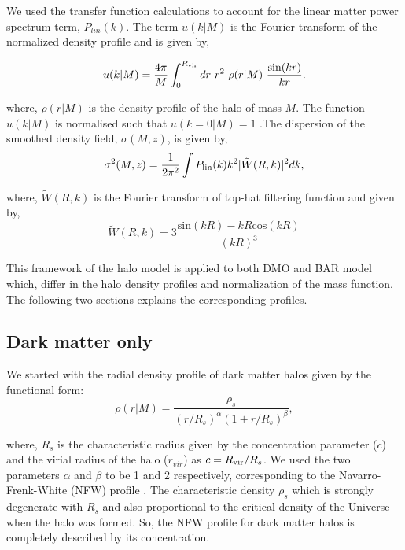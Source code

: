 \documentclass[
  11pt,
  twoside,
  openright,
  titlepage,
  headings=optiontoheadandtoc
]{scrbook}
\begin{document}
We used the \cite{1998ApJ...496..605E, 1999ApJ...511....5E} transfer function calculations to account for the linear matter power spectrum term, $P_{lin}(k)$. The term $u(k|M)$ is the Fourier transform of the normalized density profile and is given by,

\begin{equation}
	u(k|M) = \dfrac{4 \pi}{M} \int_0^{R_{\rm vir}}dr\  r^2\  \rho(r|M)\ \dfrac{\sin(kr)}{kr}.
\end{equation}

where, $\rho(r|M)$ is the density profile of the halo of mass $M$. The function $u(k|M)$ is normalised such that $u(k=0|M)=1$ .The dispersion of the smoothed density field, $\sigma(M,z)$, is given by,
\begin{equation}
	\sigma^2(M,z) = \dfrac{1}{2 \pi^2} \int P_{\rm lin}(k) k^2 |\tilde{W}(R,k)|^2 dk,
\end{equation}

where, $\tilde{W}(R,k)$ is the Fourier transform of top-hat filtering function and given by,
\begin{equation}
	\tilde{W}(R,k) = 3 \dfrac{\textrm{sin}(kR) - kR \textrm{cos}(kR)}{(kR)^3}
\end{equation}

This framework of the halo model is applied to both DMO and BAR model which, differ in the halo density profiles and normalization of the mass function. The following two sections explains the corresponding profiles.

\subsection{Dark matter only}\label{p3:sec:darkmatteronly}
We started with the radial density profile of dark matter halos given by the functional form:
\begin{equation}
 \rho(r|M) = \dfrac{\rho_s}{(r/R_s)^\alpha (1+r/R_s)^\beta},
\end{equation}

where, $R_s$ is the characteristic radius given by the concentration parameter ($c$) and the virial radius of the halo ($r_{vir}$) as $c = R_{\rm vir}/R_s$. We used the two parameters $\alpha$ and $\beta$ to be 1 and 2 respectively, corresponding to the Navarro-Frenk-White (NFW) profile \citep{1997ApJ...490..493N}. The characteristic density $\rho_s$ which is strongly degenerate with $R_s$ and also proportional to the critical density of the Universe when the halo was formed. So, the NFW profile for dark matter halos is completely described by its concentration. 
\end{document}
